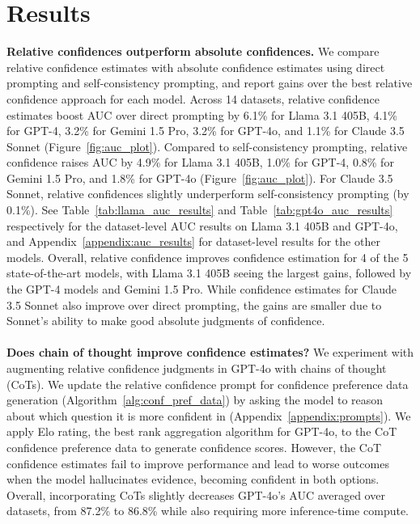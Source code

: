 \section{Results}
\label{sec:results}

\textbf{Relative confidences outperform absolute confidences.} We compare relative confidence estimates with absolute confidence estimates using direct prompting and self-consistency prompting, and report gains over the best relative confidence approach for each model. Across 14 datasets, relative confidence estimates boost AUC over direct prompting by 6.1\% for Llama 3.1 405B, 4.1\% for GPT-4, 3.2\% for Gemini 1.5 Pro, 3.2\% for GPT-4o, and 1.1\% for Claude 3.5 Sonnet (Figure~\ref{fig:auc_plot}). Compared to self-consistency prompting, relative confidence raises AUC by 4.9\% for Llama 3.1 405B, 1.0\% for GPT-4, 0.8\% for Gemini 1.5 Pro, and 1.8\% for GPT-4o (Figure~\ref{fig:auc_plot}). For Claude 3.5 Sonnet, relative confidences slightly underperform self-consistency prompting (by 0.1\%). See Table~\ref{tab:llama_auc_results} and Table~\ref{tab:gpt4o_auc_results} respectively for the dataset-level AUC results on Llama 3.1 405B and GPT-4o, and Appendix~\ref{appendix:auc_results} for dataset-level results for the other models. Overall, relative confidence improves confidence estimation for 4 of the 5 state-of-the-art models, with Llama 3.1 405B seeing the largest gains, followed by the GPT-4 models and Gemini 1.5 Pro. While confidence estimates for Claude 3.5 Sonnet also improve over direct prompting, the gains are smaller due to Sonnet’s ability to make good absolute judgments of confidence.\\\\
\noindent \textbf{Does chain of thought improve confidence estimates?}
We experiment with augmenting relative confidence judgments in GPT-4o with chains of thought (CoTs). We update the relative confidence prompt for confidence preference data generation (Algorithm~\ref{alg:conf_pref_data}) by asking the model to reason about which question it is more confident in (Appendix~\ref{appendix:prompts}). We apply Elo rating, the best rank aggregation algorithm for GPT-4o, to the CoT confidence preference data to generate confidence scores. However, the CoT confidence estimates fail to improve performance and lead to worse outcomes when the model hallucinates evidence, becoming confident in both options. Overall, incorporating CoTs slightly decreases GPT-4o’s AUC averaged over datasets, from 87.2\% to 86.8\% while also requiring more inference-time compute.
